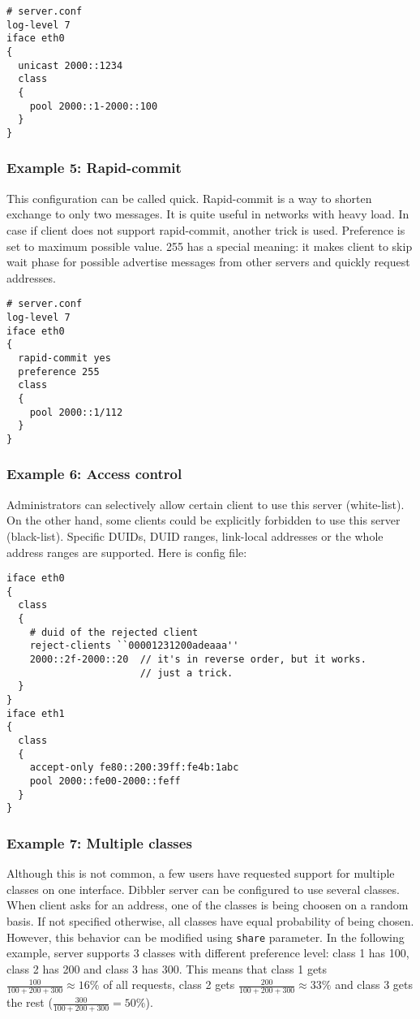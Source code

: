 \begin{verbatim}
# server.conf
log-level 7
iface eth0
{
  unicast 2000::1234
  class
  {
    pool 2000::1-2000::100
  }
}  
\end{verbatim}

\subsubsection{Example 5: Rapid-commit}
This configuration can be called quick. Rapid-commit is a way to shorten exchange to only two messages. It is
quite useful in networks with heavy load. In case if client does not
support rapid-commit, another trick is used. Preference is set to
maximum possible value. 255 has a special meaning: it makes client to
skip wait phase for possible advertise messages from other servers and
quickly request addresses.

\begin{verbatim}
# server.conf
log-level 7
iface eth0
{
  rapid-commit yes
  preference 255
  class
  {
    pool 2000::1/112
  }
}  
\end{verbatim}

\subsubsection{Example 6: Access control}
Administrators can selectively allow certain client to use this
server (white-list). On the other hand, some clients could be
explicitly forbidden to use this server (black-list). Specific DUIDs,
DUID ranges, link-local addresses or the whole address ranges are
supported. Here is config file:

\begin{verbatim}
iface eth0
{
  class
  {
    # duid of the rejected client
    reject-clients ``00001231200adeaaa''
    2000::2f-2000::20  // it's in reverse order, but it works.
                       // just a trick. 
  }
}
iface eth1
{
  class
  {
    accept-only fe80::200:39ff:fe4b:1abc
    pool 2000::fe00-2000::feff
  }
}
\end{verbatim}

\subsubsection{Example 7: Multiple classes}
Although this is not common, a few users have requested support for multiple classes on one interface.
Dibbler server can be configured to use several classes. When client asks for an address, one of the classes
is being choosen on a random basis. If not specified otherwise, all classes have equal probability of being chosen.
However, this behavior can be modified using \verb+share+ parameter. In the following example, server supports
3 classes with different preference level: class 1 has 100, class 2 has 200 and class 3 has 300. This means that class 1
gets $\frac{100}{100+200+300} \approx 16\% $ of all requests, class 2 gets $\frac{200}{100+200+300} \approx 33\% $ and class 3 gets the rest 
($\frac{300}{100+200+300}=50\% $).

